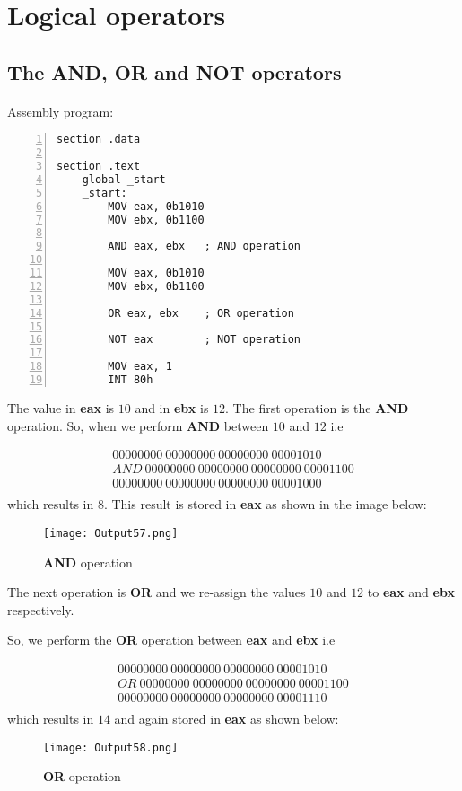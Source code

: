 \documentclass{article}
\begin{document}
\section{Logical operators}\label{sec:sec1}
\subsection{The AND, OR and NOT operators}\label{sec:subsec1}
\paragraph{}
Assembly program:
\begin{Verbatim}[numbers=left, frame=single]
section .data

section .text
	global _start
	_start:
		MOV eax, 0b1010
		MOV ebx, 0b1100
		
		AND eax, ebx   ; AND operation
		
		MOV eax, 0b1010
		MOV ebx, 0b1100
		
		OR eax, ebx    ; OR operation
		
		NOT eax        ; NOT operation
		
		MOV eax, 1
		INT 80h
\end{Verbatim}
The value in \textbf{eax} is $10$ and in \textbf{ebx} is $12$. The first operation is the \textbf{AND} operation. So, when we perform \textbf{AND} between $10$ and $12$ i.e

\begin{align*}
00000000\ 00000000\ 00000000\ 00001010 \\
AND\ 00000000\ 00000000\ 00000000\ 00001100 \\
\hline
00000000\ 00000000\ 00000000\ 00001000 \\
\end{align*}
which results in $8$. This result is stored in \textbf{eax} as shown in the image below:
\begin{figure}[h]
\centering
\texttt{[image: Output57.png]}
\caption{\textbf{AND} operation}
\label{fig:fig1}
\end{figure}
\newpage
The next operation is \textbf{OR} and we re-assign the values $10$ and $12$ to \textbf{eax} and \textbf{ebx} respectively.

So, we perform the \textbf{OR} operation between \textbf{eax} and \textbf{ebx} i.e

\begin{align*}
00000000\ 00000000\ 00000000\ 00001010 \\
OR\ 00000000\ 00000000\ 00000000\ 00001100 \\
\hline
00000000\ 00000000\ 00000000\ 00001110 \\
\end{align*}
which results in $14$ and again stored in \textbf{eax} as shown below:
\begin{figure}[h]
\centering
\texttt{[image: Output58.png]}
\caption{\textbf{OR} operation}
\label{fig:fig2}
\end{figure}
\end{document}
